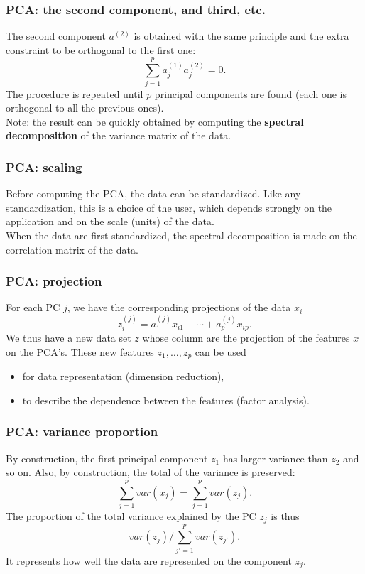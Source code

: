 \begin{frame}
\frametitle{PCA: the second component, and third, etc.}
The second component $a^{(2)}$ is obtained with the same principle and the extra constraint to be orthogonal to the first one:
$$
\sum_{j=1}^p a^{(1)}_j a^{(2)}_j = 0.
$$
The procedure is repeated until $p$ principal components are found (each one is orthogonal to all the previous ones). \\
\vspace{0.3cm}
Note: the result can be quickly obtained by computing the {\bf spectral decomposition} of the variance matrix of the data.
\end{frame}
\begin{frame}
\frametitle{PCA: scaling}
Before computing the PCA, the data can be standardized. Like any standardization, this is a choice of the user, which depends strongly on the application and on the scale (units) of the data. \\
\vspace{0.3cm}
When the data are first standardized, the spectral decomposition is made on the correlation matrix of the data.
\end{frame}
\begin{frame}
\frametitle{PCA: projection}
For each PC $j$, we have the corresponding projections of the data $x_i$
$$
z_i^{(j)} = a^{(j)}_1 x_{i1} + \cdots + a^{(j)}_p x_{ip}.
$$
We thus have a new data set $z$ whose column are the projection of the features $x$ on the PCA's. These new features $z_1, \ldots, z_p$ can be used
\begin{itemize}
\item for data representation (dimension reduction),
\item to describe the dependence between the features (factor analysis).
\end{itemize}
\end{frame}
\begin{frame}
\frametitle{PCA: variance proportion}
By construction, the first principal component $z_1$ has larger variance than $z_2$ and so on. Also, by construction, the total of the variance is preserved:
$$
\sum_{j=1}^p var(x_j) = \sum_{j=1}^p var(z_j).
$$
The proportion of the total variance explained by the PC $z_j$ is thus
$$
var(z_j)/\sum_{j'=1}^p var(z_{j'}).
$$
It represents how well the data are represented on the component $z_j$.
\end{frame}
